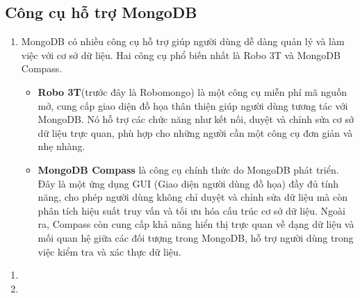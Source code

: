 \begin{enumerate}
\end{enumerate}
\newpage
\subsection{Công cụ hỗ trợ MongoDB}
\begin{enumerate}
    \item [] \hspace*{0.7cm}MongoDB có nhiều công cụ hỗ trợ giúp người dùng dễ dàng quản lý và làm việc với cơ sở dữ liệu. Hai công cụ phổ biến nhất là Robo 3T và MongoDB Compass.\cite{noauthor_mongodb_nodate_support}
    \begin{itemize}[left= 0.7cm]
        \item [$\bullet$]\textbf{Robo 3T}(trước đây là Robomongo) là một công cụ miễn phí mã nguồn mở, cung cấp giao diện đồ họa thân thiện giúp người dùng tương tác với MongoDB. Nó hỗ trợ các chức năng như kết nối, duyệt và chỉnh sửa cơ sở dữ liệu trực quan, phù hợp cho những người cần một công cụ đơn giản và nhẹ nhàng.

        \item [$\bullet$]\textbf{MongoDB Compass} là công cụ chính thức do MongoDB phát triển. Đây là một ứng dụng GUI (Giao diện người dùng đồ họa) đầy đủ tính năng, cho phép người dùng không chỉ duyệt và chỉnh sửa dữ liệu mà còn phân tích hiệu suất truy vấn và tối ưu hóa cấu trúc cơ sở dữ liệu. Ngoài ra, Compass còn cung cấp khả năng hiển thị trực quan về dạng dữ liệu và mối quan hệ giữa các đối tượng trong MongoDB, hỗ trợ người dùng trong việc kiểm tra và xác thực dữ liệu.
    \end{itemize}
    
\end{enumerate}
\begin{enumerate}
    \item []
    \item[]
     
\end{enumerate}
